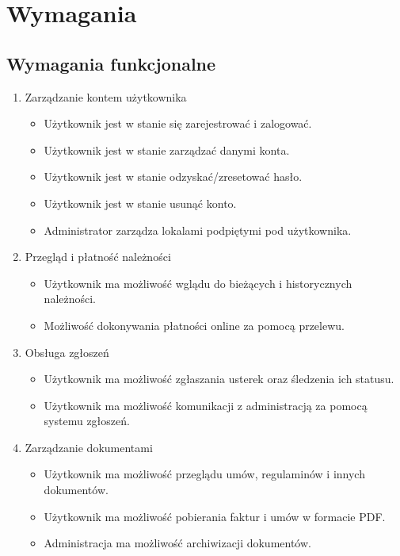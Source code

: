 \section{Wymagania}

\subsection{Wymagania funkcjonalne}

\begin{enumerate}[label=\arabic*.]
    \item Zarządzanie kontem użytkownika
    \begin{itemize}
        \item Użytkownik jest w stanie się zarejestrować i zalogować.
        \item Użytkownik jest w stanie zarządzać danymi konta.
        \item Użytkownik jest w stanie odzyskać/zresetować hasło.
        \item Użytkownik jest w stanie usunąć konto.
        \item Administrator zarządza lokalami podpiętymi pod użytkownika.
    \end{itemize}
    \item Przegląd i płatność należności
    \begin{itemize}
        \item Użytkownik ma możliwość wglądu do bieżących i historycznych należności.
        \item Możliwość dokonywania płatności online za pomocą przelewu.
    \end{itemize}
    \item Obsługa zgłoszeń
    \begin{itemize}
        \item Użytkownik ma możliwość zgłaszania usterek oraz śledzenia ich statusu.
        \item Użytkownik ma możliwość komunikacji z administracją za pomocą systemu zgłoszeń.
    \end{itemize}
    \item Zarządzanie dokumentami
    \begin{itemize}
        \item Użytkownik ma możliwość przeglądu umów, regulaminów i innych dokumentów.
        \item Użytkownik ma możliwość pobierania faktur i umów w formacie PDF.
        \item Administracja ma możliwość archiwizacji dokumentów.

\end{itemize}
\end{enumerate}
